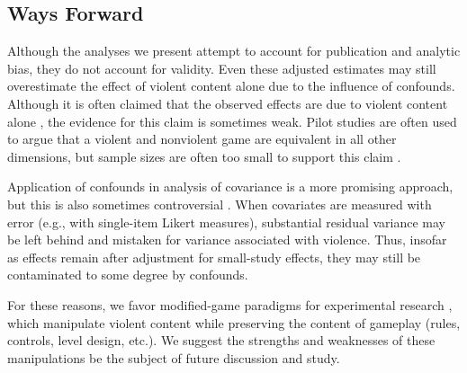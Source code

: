 \documentclass[man]{apa6}
\begin{document}
\subsection{Ways Forward}
Although the analyses we present attempt to account for publication and analytic bias, they do not account for validity. Even these adjusted estimates may still overestimate the effect of violent content alone due to the influence of confounds. Although it is often claimed that the observed effects are due to violent content alone \citep[e.g.,][]{Anderson:etal:2004}, the evidence for this claim is sometimes weak. Pilot studies are often used to argue that a violent and nonviolent game are equivalent in all other dimensions, but sample sizes are often too small to support this claim \citep{Hilgard:etal:InPress}. 

Application of confounds in analysis of covariance is a more promising approach, but this is also sometimes controversial \citep{Miller:Chapman:2001}. When covariates are measured with error (e.g., with single-item Likert measures), substantial residual variance may be left behind and mistaken for variance associated with violence. Thus, insofar as effects remain after adjustment for small-study effects, they may still be contaminated to some degree by confounds. 

For these reasons, we favor modified-game paradigms for experimental research \citep{Elson:Quandt:2014,Engelhardt:etal:2015a,Engelhardt:etal:2015,Elson:etal:2013,Kneer:etal:inpress,Hilgard:2015}, which manipulate violent content while preserving the content of gameplay (rules, controls, level design, etc.). %
We suggest the strengths and weaknesses of these manipulations be the subject of future discussion and study.
\end{document}
